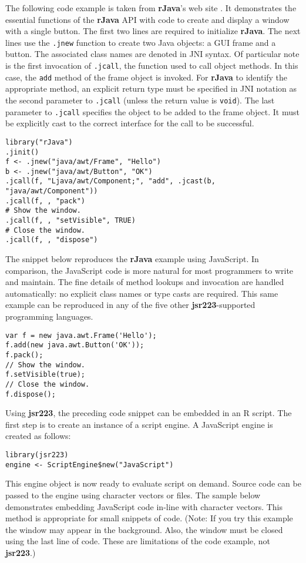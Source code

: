 \documentclass[
article,
11pt, %
a4paper, %
oneside, %
headinclude,footinclude, %
]{scrartcl}
\theoremstyle{definition} %
\theoremstyle{plain} %
\theoremstyle{remark} %
\newcommand{\pkg}[1]{\textbf{#1}}
\newcommand{\code}[1]{\texttt{#1}}
\begin{document}
The following code example is taken from \pkg{rJava}'s web site \citep{rjavaweb}. It demonstrates the essential functions of the \textbf{rJava} API with code to create and display a window with a single button. The first two lines are required to initialize \pkg{rJava}. The next lines use the \code{.jnew} function to create two Java objects: a GUI frame and a button. The associated class names are denoted in JNI syntax. Of particular note is the first invocation of \code{.jcall}, the function used to call object methods. In this case, the \code{add} method of the frame object is invoked. For \pkg{rJava} to identify the appropriate method, an explicit return type must be specified in JNI notation as the second parameter to \code{.jcall} (unless the return value is \code{void}). The last parameter to \code{.jcall} specifies the object to be added to the frame object. It must be explicitly cast to the correct interface for the call to be successful.

\begin{verbatim}
library("rJava")
.jinit()
f <- .jnew("java/awt/Frame", "Hello")
b <- .jnew("java/awt/Button", "OK")
.jcall(f, "Ljava/awt/Component;", "add", .jcast(b, "java/awt/Component"))
.jcall(f, , "pack")
# Show the window.
.jcall(f, , "setVisible", TRUE)
# Close the window.
.jcall(f, , "dispose")
\end{verbatim}

The snippet below reproduces the \pkg{rJava} example using JavaScript. In comparison, the JavaScript code is more natural for most programmers to write and maintain. The fine details of method lookups and invocation are handled automatically: no explicit class names or type casts are required. This same example can be reproduced in any of the five other \pkg{jsr223}-supported programming languages.

\begin{verbatim}
var f = new java.awt.Frame('Hello');
f.add(new java.awt.Button('OK'));
f.pack();
// Show the window.
f.setVisible(true);
// Close the window.
f.dispose();
\end{verbatim}

Using \pkg{jsr223}, the preceding code snippet can be embedded in an R script. The first step is to create an instance of a script engine. A JavaScript engine is created as follows:

\begin{verbatim}
library(jsr223)
engine <- ScriptEngine$new("JavaScript")
\end{verbatim}
This engine object is now ready to evaluate script on demand. Source code can be passed to the engine using character vectors or files. The sample below demonstrates embedding JavaScript code in-line with character vectors. This method is appropriate for small snippets of code. (Note: If you try this example the window may appear in the background. Also, the window must be closed using the last line of code. These are limitations of the code example, not \pkg{jsr223}.)
\end{document}
